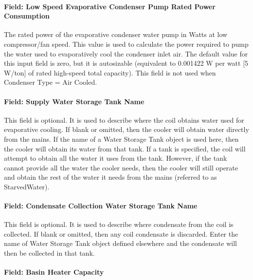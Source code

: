 \paragraph{Field: Low Speed Evaporative Condenser Pump Rated Power Consumption}\label{field-low-speed-evaporative-condenser-pump-rated-power-consumption}

The rated power of the evaporative condenser water pump in Watts at low compressor/fan speed. This value is used to calculate the power required to pump the water used to evaporatively cool the condenser inlet air. The default value for this input field is zero, but it is autosizable (equivalent to 0.001422 W per watt {[}5 W/ton{]} of rated high-speed total capacity). This field is not used when Condenser Type = Air Cooled.

\paragraph{Field: Supply Water Storage Tank Name}\label{field-supply-water-storage-tank-name-1-000}

This field is optional. It is used to describe where the coil obtains water used for evaporative cooling. If blank or omitted, then the cooler will obtain water directly from the mains. If the name of a Water Storage Tank object is used here, then the cooler will obtain its water from that tank. If a tank is specified, the coil will attempt to obtain all the water it uses from the tank. However, if the tank cannot provide all the water the cooler needs, then the cooler will still operate and obtain the rest of the water it needs from the mains (referred to as StarvedWater).

\paragraph{Field: Condensate Collection Water Storage Tank Name}\label{field-condensate-collection-water-storage-tank-name-3}

This field is optional. It is used to describe where condensate from the coil is collected. If blank or omitted, then any coil condensate is discarded. Enter the name of Water Storage Tank object defined elsewhere and the condensate will then be collected in that tank.

\paragraph{Field: Basin Heater Capacity}\label{field-basin-heater-capacity-1-000}

